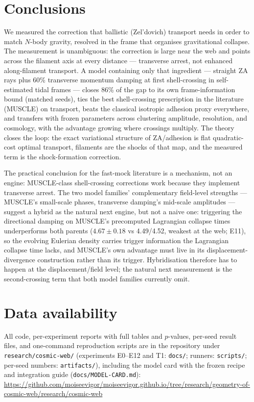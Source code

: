 \documentclass[11pt]{article}
\begin{document}
\section{Conclusions}
\label{sec:conclusions}

We measured the correction that ballistic (Zel'dovich) transport needs in order to match $N$-body gravity, resolved in the frame that organises gravitational collapse. The measurement is unambiguous: the correction is large near the web and points across the filament axis at every distance --- transverse arrest, not enhanced along-filament transport. A model containing only that ingredient --- straight ZA rays plus 60\% transverse momentum damping at first shell-crossing in self-estimated tidal frames --- closes 86\% of the gap to its own frame-information bound (matched seeds), ties the best shell-crossing prescription in the literature (MUSCLE) on transport, beats the classical isotropic adhesion proxy everywhere, and transfers with frozen parameters across clustering amplitude, resolution, and cosmology, with the advantage growing where crossings multiply. The theory closes the loop: the exact variational structure of ZA/adhesion is flat quadratic-cost optimal transport, filaments are the shocks of that map, and the measured term is the shock-formation correction.

The practical conclusion for the fast-mock literature is a mechanism, not an engine: MUSCLE-class shell-crossing corrections work because they implement transverse arrest. The two model families' complementary field-level strengths --- MUSCLE's small-scale phases, transverse damping's mid-scale amplitudes --- suggest a hybrid as the natural next engine, but not a naive one: triggering the directional damping on MUSCLE's precomputed Lagrangian collapse times underperforms both parents ($4.67 \pm 0.18$ vs 4.49/4.52, weakest at the web; E11), so the evolving Eulerian density carries trigger information the Lagrangian collapse time lacks, and MUSCLE's own advantage must live in its displacement-divergence construction rather than its trigger. Hybridisation therefore has to happen at the displacement/field level; the natural next measurement is the second-crossing term that both model families currently omit.

\section*{Data availability}

All code, per-experiment reports with full tables and $p$-values, per-seed result files, and one-command reproduction scripts are in the repository under \texttt{research/cosmic-web/} (experiments E0--E12 and T1: \texttt{docs/}; runners: \texttt{scripts/}; per-seed numbers: \texttt{artifacts/}), including the model card with the frozen recipe and integration guide (\texttt{docs/MODEL-CARD.md}): \url{https://github.com/moiseevigor/moiseevigor.github.io/tree/research/geometry-of-cosmic-web/research/cosmic-web}
\end{document}
